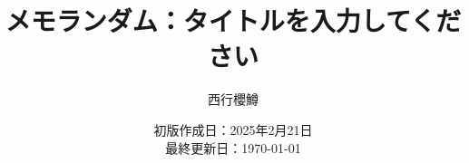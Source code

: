 \newcommand{\CATEGORY}{メモランダム}%
\newcommand{\TITLE}{タイトルを入力してください}
\newcommand{\AUTHORNAME}{西行櫻鱒}
\newcommand{\CREATEDAT}{2025年2月21日}

\title{\CATEGORY：\TITLE}
\author{\AUTHORNAME}
\date{初版作成日：\CREATEDAT\\最終更新日：\today}

